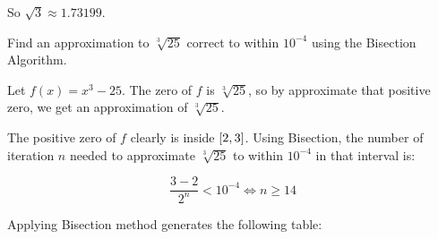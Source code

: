 \documentclass[../../Assignments.tex]{subfiles}
\begin{document}
\begin{solution}
    So \(\sqrt{3} \approx \num{1.73199}\).
\end{solution}

\begin{exercise}
    Find an approximation to \(\sqrt[3]{25}\) correct to within \(10^{−4}\)
    using the Bisection Algorithm.
\end{exercise}

\begin{solution}
    Let \(f(x) = x^3 - 25\). The zero of \(f\) is \(\sqrt[3]{25}\), so by
    approximate that positive zero, we get an approximation of \(\sqrt[3]{25}\).

    The positive zero of \(f\) clearly is inside \(\interval{2}{3}\). Using
    Bisection, the number of iteration \(n\) needed to approximate
    \(\sqrt[3]{25}\) to within \(10^{-4}\) in that interval is:

    \[\frac{3 - 2}{2^n} < 10^{-4} \iff n \geq 14\]

    Applying Bisection method generates the following table:


\end{solution}
\end{document}
